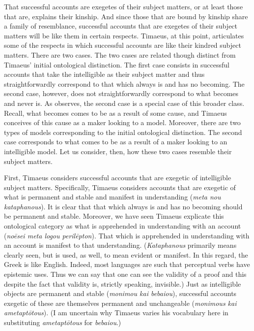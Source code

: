 That successful accounts are exegetes of their subject matters, or at least those that are, explains their kinship. And since those that are bound by kinship share a family of resemblance, successful accounts that are exegetes of their subject matters will be like them in certain respects. Timaeus, at this point, articulates some of the respects in which successful accounts are like their kindred subject matters. There are two cases. The two cases are related though distinct from Timaeus' initial ontological distinction. The first case consists in successful accounts that take the intelligible as their subject matter and thus straightforwardly correspond to that which always is and has no becoming. The second case, however, does not straightforwardly correspond to what becomes and never is. As \citet{Betegh:2010aa} observes, the second case is a special case of this broader class. Recall, what becomes comes to be as a result of some cause, and Timaeus conceives of this cause as a maker looking to a model. Moreover, there are two types of models corresponding to the initial ontological distinction. The second case corresponds to what comes to be as a result of a maker looking to an intelligible model. Let us consider, then, how these two cases resemble their subject matters.

First, Timaeus considers successful accounts that are exegetic of intelligible subject matters. Specifically, Timaeus considers accounts that are exegetic of what is permanent and stable and manifest in understanding (\emph{meta nou kataphanous}). It is clear that that which always is and has no becoming should be permanent and stable. Moreover, we have seen Timaeus explicate this ontological category as what is apprehended in understanding with an account (\emph{noēsei meta logou perilēpton}). That which is apprehended in understanding with an account is manifest to that understanding. (\emph{Kataphanous} primarily means clearly seen, but is used, as well, to mean evident or manifest. In this regard, the Greek is like English. Indeed, most languages are such that perceptual verbs have epistemic uses. Thus we can say that one can see the validity of a proof and this despite the fact that validity is, strictly speaking, invisible.) Just as intelligible objects are permanent and stable (\emph{monimou kai bebaiou}), successful accounts exegetic of these are themselves permanent and unchangeable (\emph{monimous kai ametaptōtous}). (I am uncertain why Timaeus varies his vocabulary here in substituting \emph{ametaptōtous} for \emph{bebaiou}.)

